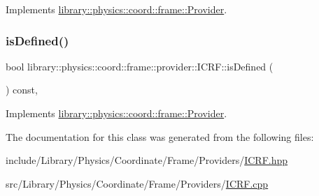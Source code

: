 Implements \hyperlink{classlibrary_1_1physics_1_1coord_1_1frame_1_1_provider_a796fd2dd337f1304a0e9acf573ce2550}{library\+::physics\+::coord\+::frame\+::\+Provider}.

\mbox{\label{classlibrary_1_1physics_1_1coord_1_1frame_1_1provider_1_1_i_c_r_f_a533e5d0240150b5c23080ee8bf89d040}} 
\subsubsection{\texorpdfstring{is\+Defined()}{isDefined()}}
{\footnotesize\ttfamily bool library\+::physics\+::coord\+::frame\+::provider\+::\+I\+C\+R\+F\+::is\+Defined (\begin{DoxyParamCaption}{ }\end{DoxyParamCaption}) const\hspace{0.3cm}{\ttfamily [override]}, {\ttfamily [virtual]}}



Implements \hyperlink{classlibrary_1_1physics_1_1coord_1_1frame_1_1_provider_ae7cd093febf2b20f71400f9f79442774}{library\+::physics\+::coord\+::frame\+::\+Provider}.



The documentation for this class was generated from the following files\+:\begin{DoxyCompactItemize}
\item 
include/\+Library/\+Physics/\+Coordinate/\+Frame/\+Providers/\hyperlink{_i_c_r_f_8hpp}{I\+C\+R\+F.\+hpp}\item 
src/\+Library/\+Physics/\+Coordinate/\+Frame/\+Providers/\hyperlink{_i_c_r_f_8cpp}{I\+C\+R\+F.\+cpp}\end{DoxyCompactItemize}
